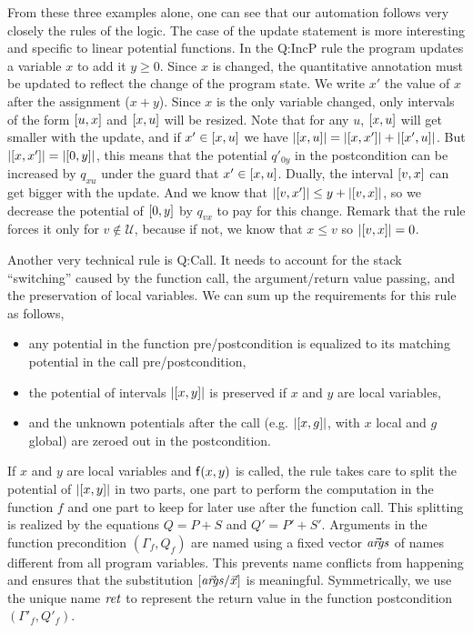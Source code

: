 \documentclass[nocopyrightspace,preprint]{sigplanconf}
\begin{document}
From these three examples alone, one can see that our
automation follows very closely the rules of the logic.
The case of the update statement is more interesting
and specific to linear potential functions.
In the {\sc Q:IncP} rule the program updates a variable
$x$ to add it $y \ge 0$.  Since $x$ is changed, the
quantitative annotation must be updated to reflect the
change of the program state.  We write $x'$ the value
of $x$ after the assignment ($x + y$). Since $x$ is
the only variable changed, only intervals of the form
$[u,x]$ and $[x,u]$ will be resized.
Note that for any $u$, $[x,u]$ will get smaller
with the update,  and if $x' \in [x,u]$ 
we have $|[x,u]| = |[x,x']| + |[x',u]|$.
But $|[x,x']| = |[0,y]|$, this means that
the potential $q'_{0y}$ in the postcondition can
be increased by $q_{xu}$ under the guard that
$x' \in [x,u]$.  Dually, the interval
$[v,x]$ can get bigger with the update.
And we know that $|[v,x']| \le y + |[v,x]|$,
so we decrease the potential of $[0,y]$
by $q_{vx}$ to pay for this change.  Remark that
the rule forces it only for $v \not\in \mathcal U$,
because if not, we know that $x \le v$ so
$|[v,x]| = 0$.

Another very technical rule is {\sc Q:Call}.  It needs to
account for the stack ``switching'' caused by the function
call, the argument/return value passing, and the preservation
of local variables.  We can sum up the requirements for
this rule as follows,
\begin{itemize}
\item
  any potential in the function pre/postcondition is equalized
  to its matching potential in the call pre/postcondition,
\item
  the potential of intervals $|[x,y]|$ is preserved
  if $x$ and $y$ are local variables,
\item
  and the unknown potentials after the call (e.g.
  $|[x,g]|$, with $x$ local and $g$ global)
  are zeroed out in the postcondition.
\end{itemize}
If $x$ and $y$ are local variables and $\mathsf{f}(x,y)$ is
called, the rule takes care to split the potential of
$|[x,y]|$ in two parts, one part to perform the
computation in the function $f$ and one part to keep for
later use after the function call.  This splitting is
realized by the equations $Q = P + S$ and $Q' =
P' + S'$.  Arguments in the function precondition
$(\Gamma_f, Q_f)$ are named using a fixed vector ${\vec {\mathit{args}}}$
of names different from all program variables.  This
prevents name conflicts from happening and ensures that
the substitution $[{\vec {\mathit{args}}}/\vec x]$ is meaningful.
Symmetrically, we use the unique name ${\mathit{ret}}$ to represent
the return value in the function postcondition
$(\Gamma'_f, Q'_f)$.
\end{document}
